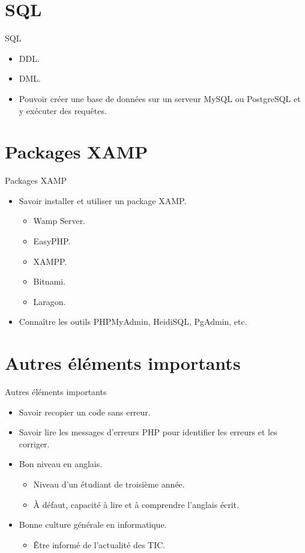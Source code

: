 \documentclass{beamer}
\begin{document}
\section{SQL}
\begin{frame}{SQL}
\begin{center}
\begin{itemize}
  \item DDL.
  \item DML.
  \item Pouvoir créer une base de données sur un serveur MySQL ou PostgreSQL et y exécuter des requêtes.
\end{itemize}
\end{center}
\end{frame}

\section{Packages XAMP}
\begin{frame}{Packages XAMP}
\begin{itemize}
  \item Savoir installer et utiliser un package XAMP.
    \begin{itemize}
      \item Wamp Server.
      \item EasyPHP.
      \item XAMPP.
      \item Bitnami.
      \item Laragon.
    \end{itemize}
  \item Connaître les outils PHPMyAdmin, HeidiSQL, PgAdmin, etc.
\end{itemize}
\end{frame}

\section{Autres éléments importants}
\begin{frame}{Autres éléments importants}
\begin{itemize}
  \item Savoir recopier un code sans erreur.
  \item Savoir lire les messages d'erreurs PHP pour identifier les erreurs et les corriger.
  \item Bon niveau en anglais.
  \begin{itemize}
    \item Niveau d'un étudiant de troisième année.
    \item \`{A} défaut, capacité à lire et à comprendre l'anglais écrit.
  \end{itemize}
  \item Bonne culture générale en informatique.
  \begin{itemize}
    \item Être informé de l'actualité des TIC.
  \end{itemize}
\end{itemize}
\end{frame}
\end{document}
